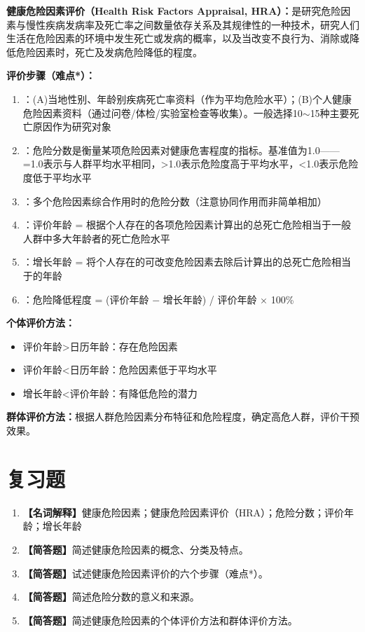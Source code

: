 \begin{keybox}
\textbf{健康危险因素评价（Health Risk Factors Appraisal, HRA）：}是研究危险因素与慢性疾病发病率及死亡率之间数量依存关系及其规律性的一种技术，研究人们生活在危险因素的环境中发生死亡或发病的概率，以及当改变不良行为、消除或降低危险因素时，死亡及发病危险降低的程度。

\textbf{评价步骤（难点*）：}
\begin{enumerate}[leftmargin=*]
    \item {}：(A)当地性别、年龄别疾病死亡率资料（作为平均危险水平）；(B)个人健康危险因素资料（通过问卷/体检/实验室检查等收集）。一般选择10$\sim$15种主要死亡原因作为研究对象
    \item {}：危险分数是衡量某项危险因素对健康危害程度的指标。基准值为1.0——=1.0表示与人群平均水平相同，>1.0表示危险度高于平均水平，<1.0表示危险度低于平均水平
    \item {}：多个危险因素综合作用时的危险分数（注意协同作用而非简单相加）
    \item {}：评价年龄 = 根据个人存在的各项危险因素计算出的总死亡危险相当于一般人群中多大年龄者的死亡危险水平
    \item {}：增长年龄 = 将个人存在的可改变危险因素去除后计算出的总死亡危险相当于的年龄
    \item {}：危险降低程度 = (评价年龄 $-$ 增长年龄) / 评价年龄 × 100\%
\end{enumerate}

\textbf{个体评价方法：}
\begin{itemize}[leftmargin=*]
    \item 评价年龄>日历年龄：存在危险因素
    \item 评价年龄<日历年龄：危险因素低于平均水平
    \item 增长年龄<评价年龄：有降低危险的潜力
\end{itemize}

\textbf{群体评价方法：}根据人群危险因素分布特征和危险程度，确定高危人群，评价干预效果。
\end{keybox}

\section{复习题}

\begin{enumerate}[leftmargin=*, itemsep=8pt]
    \item \textbf{【名词解释】}健康危险因素；健康危险因素评价（HRA）；危险分数；评价年龄；增长年龄
    \item \textbf{【简答题】}简述健康危险因素的概念、分类及特点。
    \item \textbf{【简答题】}试述健康危险因素评价的六个步骤（难点*）。
    \item \textbf{【简答题】}简述危险分数的意义和来源。
    \item \textbf{【简答题】}简述健康危险因素的个体评价方法和群体评价方法。
\end{enumerate}

